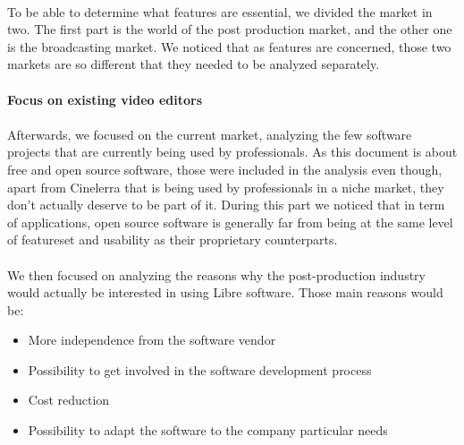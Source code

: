 \paragraph{}

To be able to determine what features are essential, we divided the
market in two. The first part is the world of the post production market,
and the other one is the broadcasting market. We noticed that as features
are concerned, those two markets are so different that they needed to
be analyzed separately.

\paragraph{Focus on existing video editors}

\paragraph{}

Afterwards, we focused on the current market, analyzing the few software
projects that are currently being used by professionals. As this
document is about free and open source software, those were included
in the analysis even though, apart from Cinelerra that is being used
by professionals in a niche market, they don't actually deserve to be
part of it. During this part we noticed that in term of applications,
open source software is generally far from being at the same level of
featureset and usability as their proprietary counterparts.

\paragraph{}

We then focused on analyzing the reasons why the post-production industry
would actually be interested in using Libre software. Those main reasons
would be:

\begin{itemize}

  \item {More independence from the software vendor}

  \item {Possibility to get involved in the software development
  process}

   \item {Cost reduction}

   \item {Possibility to adapt the software to the company particular
   needs}

\end{itemize}

